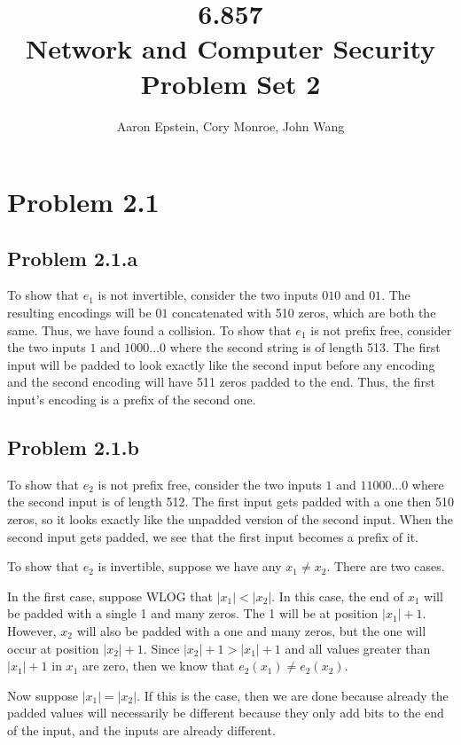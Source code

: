 \documentclass[psamsfonts]{amsart}
\title{6.857 \\
Network and Computer Security \\
Problem Set 2}
\author{Aaron Epstein, Cory Monroe, John Wang}
\begin{document}
\maketitle

\section*{Problem 2.1}

\subsection*{Problem 2.1.a}

To show that $e_1$ is not invertible, consider the two inputs $010$ and $01$. The resulting encodings will be $01$ concatenated with 510 zeros, which are both the same. Thus, we have found a collision. To show that $e_1$ is not prefix free, consider the two inputs $1$ and $1000\ldots0$ where the second string is of length 513. The first input will be padded to look exactly like the second input before any encoding and the second encoding will have 511 zeros padded to the end. Thus, the first input's encoding is a prefix of the second one.

\subsection*{Problem 2.1.b}

To show that $e_2$ is not prefix free, consider the two inputs $1$ and $11000\ldots0$ where the second input is of length 512. The first input gets padded with a one then 510 zeros, so it looks exactly like the unpadded version of the second input. When the second input gets padded, we see that the first input becomes a prefix of it.

To show that $e_2$ is invertible, suppose we have any $x_1 \neq x_2$. There are two cases.

In the first case, suppose WLOG that $|x_1| < |x_2|$. In this case, the end of $x_1$ will be padded with a single 1 and many zeros. The 1 will be at position $|x_1| + 1$. However, $x_2$ will also be padded with a one and many zeros, but the one will occur at position $|x_2| + 1$. Since $|x_2| + 1 > |x_1| + 1$ and all values greater than $|x_1| + 1$ in $x_1$ are zero, then we know that $e_2(x_1) \neq e_2(x_2)$. 

Now suppose $|x_1| = |x_2|$. If this is the case, then we are done because already the padded values will necessarily be different because they only add bits to the end of the input, and the inputs are already different.
\end{document}
